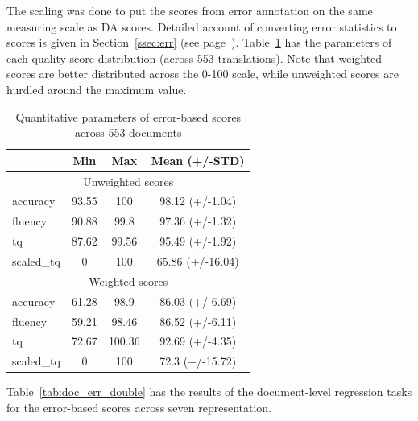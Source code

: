 The scaling was done to put the scores from error annotation on the same measuring scale as DA scores. Detailed account of converting error statistics to scores is given in Section~\ref{ssec:err} (see page~\pageref{pg:err-score-generation}). 
Table~\ref{tab:docs_err_par} has the parameters of each quality score distribution (across 553 translations). Note that weighted scores are better distributed across the 0-100 scale, while unweighted scores are hurdled around the maximum value.
\begin{table}[H]
	\centering
	\begin{tabular}{l|ccc}
		\toprule
		& Min   & Max    & Mean (+/-STD)  \\
		\midrule
		\multicolumn{4}{c}{Unweighted scores} \\
		\midrule
		accuracy   & 93.55 & 100    & 98.12 (+/-1.04)  \\
		fluency    & 90.88 & 99.8   & 97.36 (+/-1.32)  \\
		tq         & 87.62 & 99.56  & 95.49 (+/-1.92)  \\
		scaled\_tq & 0     & 100    & 65.86 (+/-16.04) \\
		\midrule
		\multicolumn{4}{c}{Weighted scores} \\
		\midrule
		accuracy   & 61.28 & 98.9   & 86.03 (+/-6.69)  \\
		fluency    & 59.21 & 98.46  & 86.52 (+/-6.11)  \\
		tq         & 72.67 & 100.36 & 92.69 (+/-4.35)  \\
		scaled\_tq & 0     & 100    & 72.3  (+/-15.72) \\
		\bottomrule
	\end{tabular}
	\caption{\label{tab:docs_err_par}Quantitative parameters of error-based scores across 553 documents}
\end{table}

Table~\ref{tab:doc_err_double} has the results of the document-level regression tasks for the error-based scores across seven representation.
